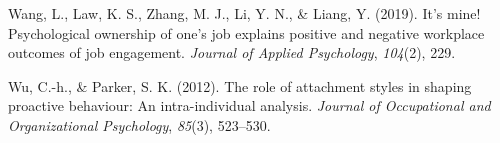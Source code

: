 \documentclass[english,,man]{apa6}
\theoremstyle{definition}
\theoremstyle{definition}
\theoremstyle{definition}
\theoremstyle{remark}
\begin{document}
\leavevmode\hypertarget{ref-wang2019s}{}%
Wang, L., Law, K. S., Zhang, M. J., Li, Y. N., \& Liang, Y. (2019). It's
mine! Psychological ownership of one's job explains positive and
negative workplace outcomes of job engagement. \emph{Journal of Applied
Psychology}, \emph{104}(2), 229.

\leavevmode\hypertarget{ref-wu2012role}{}%
Wu, C.-h., \& Parker, S. K. (2012). The role of attachment styles in
shaping proactive behaviour: An intra-individual analysis. \emph{Journal
of Occupational and Organizational Psychology}, \emph{85}(3), 523--530.
\end{document}
